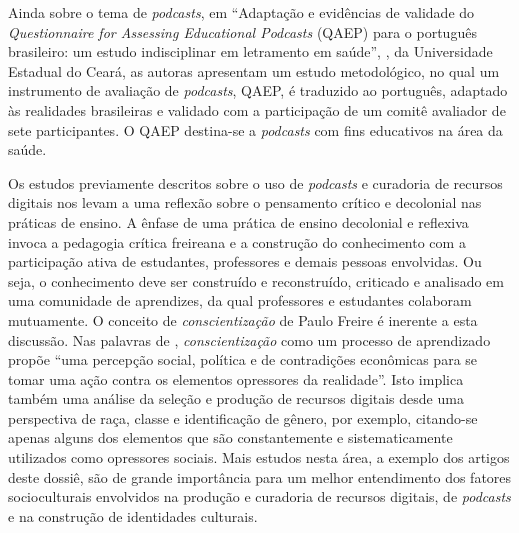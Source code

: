 \documentclass[portuguese]{textolivre}
\begin{document}
Ainda sobre o tema de \textit{podcasts}, em “Adaptação e evidências de validade do \textit{Questionnaire for Assessing Educational Podcasts} (QAEP) para o português brasileiro: um estudo indisciplinar em letramento em saúde”, \textcite{sampaio_adaptacao_2024}, da Universidade Estadual do Ceará, as autoras apresentam um estudo metodológico, no qual um instrumento de avaliação de \textit{podcasts}, QAEP, é traduzido ao português, adaptado às realidades brasileiras e validado com a participação de um comitê avaliador de sete participantes. O QAEP destina-se a \textit{podcasts} com fins educativos na área da saúde.

Os estudos previamente descritos sobre o uso de \textit{podcasts} e curadoria de recursos digitais nos levam a uma reflexão sobre o pensamento crítico e decolonial nas práticas de ensino. A ênfase de uma prática de ensino decolonial e reflexiva invoca a pedagogia crítica freireana e a construção do conhecimento com a participação ativa de estudantes, professores e demais pessoas envolvidas. Ou seja, o conhecimento deve ser construído e reconstruído, criticado e analisado em uma comunidade de aprendizes, da qual professores e estudantes colaboram mutuamente. O conceito de \emph{conscientização} de Paulo Freire é inerente a esta discussão. Nas palavras de \textcite[p. 35, tradução nossa]{macedo_introduction_2005}, \textit{conscientização} como um processo de aprendizado propõe “uma percepção social, política e de contradições econômicas para se tomar uma ação contra os elementos opressores da realidade”. Isto implica também uma análise da seleção e produção de recursos digitais desde uma perspectiva de raça, classe e identificação de gênero, por exemplo, citando-se apenas alguns dos elementos que são constantemente e sistematicamente utilizados como opressores sociais. Mais estudos nesta área, a exemplo dos artigos deste dossiê, são de grande importância para um melhor entendimento dos fatores socioculturais envolvidos na produção e curadoria de recursos digitais, de \textit{podcasts} e na construção de identidades culturais. 
\end{document}
